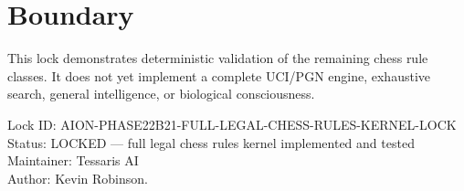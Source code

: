 \documentclass[11pt,a4paper]{article}
\begin{document}
\section{Boundary}

This lock demonstrates deterministic validation of the remaining chess rule classes. It does not yet implement a complete UCI/PGN engine, exhaustive search, general intelligence, or biological consciousness.

\bigskip

\noindent
Lock ID: AION-PHASE22B21-FULL-LEGAL-CHESS-RULES-KERNEL-LOCK\\
Status: LOCKED --- full legal chess rules kernel implemented and tested\\
Maintainer: Tessaris AI\\
Author: Kevin Robinson.
\end{document}
